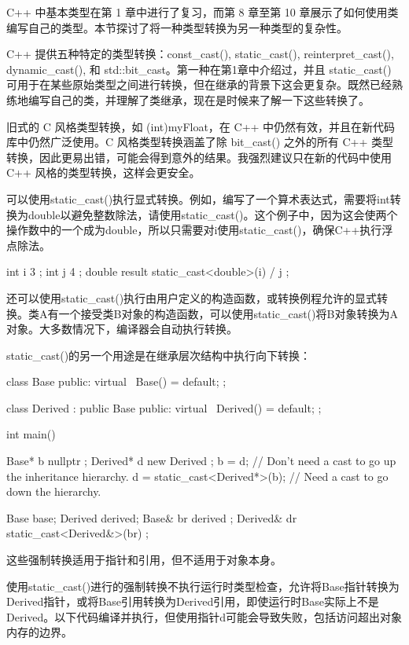 
C++ 中基本类型在第 1 章中进行了复习，而第 8 章至第 10 章展示了如何使用类编写自己的类型。本节探讨了将一种类型转换为另一种类型的复杂性。

C++ 提供五种特定的类型转换：const\_cast(), static\_cast(), reinterpret\_cast(), dynamic\_cast(), 和 std::bit\_cast。第一种在第1章中介绍过，并且 static\_cast() 可用于在某些原始类型之间进行转换，但在继承的背景下这会更复杂。既然已经熟练地编写自己的类，并理解了类继承，现在是时候来了解一下这些转换了。

旧式的 C 风格类型转换，如 (int)myFloat，在 C++ 中仍然有效，并且在新代码库中仍然广泛使用。C 风格类型转换涵盖了除 bit\_cast() 之外的所有 C++ 类型转换，因此更易出错，可能会得到意外的结果。我强烈建议只在新的代码中使用 C++ 风格的类型转换，这样会更安全。


可以使用static\_cast()执行显式转换。例如，编写了一个算术表达式，需要将int转换为double以避免整数除法，请使用static\_cast()。这个例子中，因为这会使两个操作数中的一个成为double，所以只需要对i使用static\_cast()，确保C++执行浮点除法。

\begin{cpp}
int i { 3 };
int j { 4 };
double result { static_cast<double>(i) / j };
\end{cpp}

还可以使用static\_cast()执行由用户定义的构造函数，或转换例程允许的显式转换。类A有一个接受类B对象的构造函数，可以使用static\_cast()将B对象转换为A对象。大多数情况下，编译器会自动执行转换。

static\_cast()的另一个用途是在继承层次结构中执行向下转换：

\begin{cpp}
class Base
{
    public:
        virtual ~Base() = default;
};

class Derived : public Base
{
    public:
        virtual ~Derived() = default;
};

int main()
{
    Base* b { nullptr };
    Derived* d { new Derived {} };
    b = d; // Don't need a cast to go up the inheritance hierarchy.
    d = static_cast<Derived*>(b); // Need a cast to go down the hierarchy.

    Base base;
    Derived derived;
    Base& br { derived };
    Derived& dr { static_cast<Derived&>(br) };
}
\end{cpp}

这些强制转换适用于指针和引用，但不适用于对象本身。

使用static\_cast()进行的强制转换不执行运行时类型检查，允许将Base指针转换为Derived指针，或将Base引用转换为Derived引用，即使运行时Base实际上不是Derived。以下代码编译并执行，但使用指针d可能会导致失败，包括访问超出对象内存的边界。

